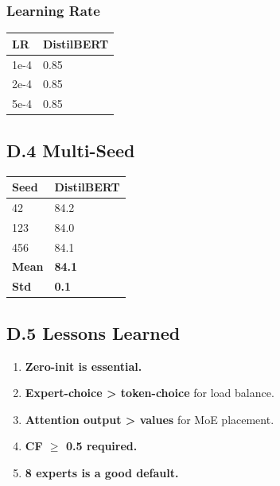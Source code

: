 \subsubsection{Learning Rate}

\begin{table}[H]
\centering
\small
\begin{tabular}{ll}
\toprule
\textbf{LR} & \textbf{DistilBERT} \\
\midrule
1e-4 & 0.85 \\
2e-4 & 0.85 \\
5e-4 & 0.85 \\
\bottomrule
\end{tabular}
\end{table}

\subsection{D.4 Multi-Seed}

\begin{table}[H]
\centering
\small
\begin{tabular}{ll}
\toprule
\textbf{Seed} & \textbf{DistilBERT} \\
\midrule
42 & 84.2 \\
123 & 84.0 \\
456 & 84.1 \\
\textbf{Mean} & \textbf{84.1} \\
\textbf{Std} & \textbf{0.1} \\
\bottomrule
\end{tabular}
\end{table}

\subsection{D.5 Lessons Learned}

\begin{enumerate}
\item \textbf{Zero-init is essential.}
\item \textbf{Expert-choice \textgreater{} token-choice} for load balance.
\item \textbf{Attention output \textgreater{} values} for MoE placement.
\item \textbf{CF $\ge$ 0.5 required.}
\item \textbf{8 experts is a good default.}

\end{enumerate}
